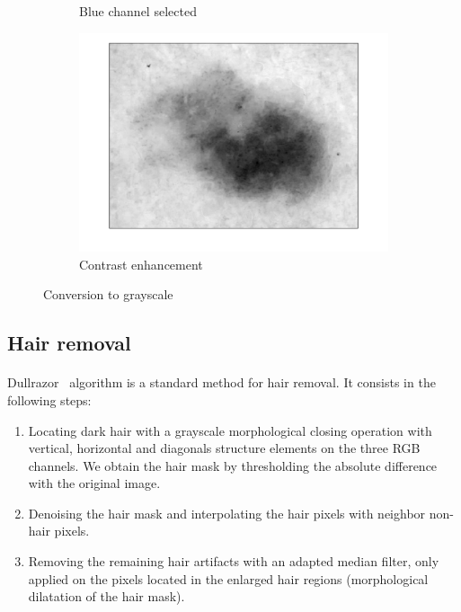 \documentclass[a4paper,10pt]{article}
\begin{document}
\begin{figure}
\begin{subfigure}{0.32\linewidth}
	\caption{Blue channel selected}
	\label{fig:grayscale-no-dyn}
\end{subfigure}
\begin{subfigure}{0.32\linewidth}			
	\includegraphics[width=0.99\linewidth]{../results/color-channel-influence/dyn_range.png}	  
	\caption{Contrast enhancement}
	\label{fig:grayscale-dyn}
\end{subfigure}
	\caption{Conversion to grayscale}
	\label{fig:grayscale}
\end{figure}

\subsection{Hair removal}
\paragraph{} Dullrazor~\cite{Dullrazor1997} algorithm is a standard method for 
hair removal. It consists in the following steps:
\begin{enumerate}
	\item Locating dark hair with a grayscale morphological closing operation with 
	vertical, horizontal and diagonals structure elements on the three RGB channels. 
	We obtain the hair mask by thresholding the absolute difference with the 
	original image. 
	\item Denoising the hair mask and interpolating the hair pixels with neighbor 
	non-hair pixels. 
	\item Removing the remaining hair artifacts with an adapted median filter, only 
	applied on the pixels located in the enlarged hair regions
	(morphological dilatation of the hair mask).
\end{enumerate}
\end{document}
